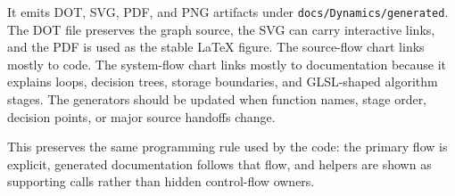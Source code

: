 It emits DOT, SVG, PDF, and PNG artifacts under
\texttt{docs/Dynamics/generated}.  The DOT file preserves the graph source, the
SVG can carry interactive links, and the PDF is used as the stable LaTeX figure.
The source-flow chart links mostly to code.  The system-flow chart links mostly
to documentation because it explains loops, decision trees, storage boundaries,
and GLSL-shaped algorithm stages.  The generators should be updated when
function names, stage order, decision points, or major source handoffs change.

This preserves the same programming rule used by the code: the primary flow is
explicit, generated documentation follows that flow, and helpers are shown as
supporting calls rather than hidden control-flow owners.
